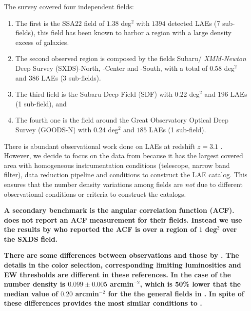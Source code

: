 \documentclass[usenatbib]{mn2e}
\begin{document}
The survey covered four independent fields:

\begin{enumerate}
\item The first is the SSA22
field of $1.38$ deg$^2$ with $1394$ detected LAEs (7 sub-fields), this
field has been known to harbor a region with a large density excess of
galaxies. 

\item The second observed region is composed by the fields Subaru/{\it
  XMM-Newton} Deep Survey (SXDS)-North, -Center and -South, with a
total of $0.58$ deg$^2$ and $386$ LAEs (3 sub-fields).

\item The third  field is the Subaru Deep Field (SDF) with $0.22$ deg$^2$ and
$196$ LAEs (1 sub-field), and 

\item The fourth one is the field around the Great Observatory
Optical Deep Survey  (GOODS-N) with $0.24$ deg$^2$ and $185$ LAEs (1
sub-field).  
\end{enumerate}
   

There is abundant observational work done on LAEs at redshift $z=3.1$
\citep{Kudritzki2000,Matsuda2005,Gawiser2007,Nilsson2007,Ouchi2008}.
However, we decide to focus on the data from \cite{Yamada2012} because
it has the largest covered area with homogeneous instrumentation
conditions (telescope, narrow band filter), data reduction pipeline
and conditions to construct the LAE catalog. This ensures that the
number density variations among fields are \emph{not} due to different
observational conditions or criteria to construct the catalogs.

{\bf A secondary benchmark is the angular correlation function
(ACF). \cite{Yamada2012} does not report an ACF measurement for
  their fields. Instead we use the results by   \cite{Ouchi2008} who
  reported the ACF is over a region of $1$ deg$^2$ over the SXDS
  field.  }

{\bf There are some differences between \cite{Ouchi2008} observations
  and those by \cite{Yamada2012}. The details in the color selection,
  corresponding limiting luminosities and EW thresholds are different
  in these references. In the case of
  \cite{Ouchi2008} the number density is $0.099\pm0.005$ arcmin$^{-2}$, which
  is 50\% lower that the median value of $0.20$ arcmin$^{-2}$ for the
  the general fields in \cite{Yamada2012}. In spite of these
  differences \cite{Ouchi2008} provides the most similar conditions
  to \cite{Yamada2012}.}    
\end{document}
